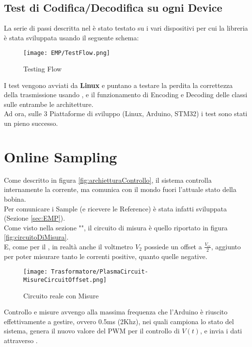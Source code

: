 \subsection{Test di Codifica/Decodifica su ogni Device}
La serie di passi descritta nel  è stato testato su i vari dispositivi per cui la libreria è stata sviluppata usando il seguente schema:
\begin{figure}[h]
	\centering
	\texttt{[image: EMP/TestFlow.png]}
	\caption[EMP Benchmark Testing Flow]{Testing Flow}
\end{figure}

\noindent
I test vengono avviati da \textbf{Linux} e puntano a testare la perdita la correttezza della trasmissione usando , e il funzionamento di Encoding e Decoding delle classi sulle entrambe le architetture.\\
Ad ora, sulle 3 Piattaforme di sviluppo (Linux, Arduino, STM32) i test sono stati un pieno successo.

\newpage
\section{Online Sampling}
Come descritto in figura \ref{fig:archietturaControllo}, il sistema controlla internamente la corrente, ma comunica con il mondo fuori l'attuale stato della bobina.\\
Per comunicare i Sample (e ricevere le Reference) è stata infatti sviluppata (Sezione \ref{sec:EMP}).\\
Come visto nella sezione "", il circuito di misura è quello riportato in figura \ref{fig:circuitoDiMisura}.\\
E, come per il , in realtà anche il voltmetro $V_2$ possiede un offset a $\frac{V_{cc}}{2}$, aggiunto per poter misurare tanto le correnti positive, quanto quelle negative.
\begin{figure}[h]
	\centering
	\texttt{[image: Trasformatore/PlasmaCircuit-MisureCircuitOffset.png]}
	\caption[Circuito equivalente del Plasma con l'offset delle Misure]{Circuito reale con Misure}
\end{figure}

\noindent
Controllo e misure avvengo alla massima frequenza che l'Arduino è riuscito effettivamente a gestire, ovvero 0.5ms (2Khz), nei quali campiona lo stato del sistema, genera il nuovo valore del PWM per il controllo di $V(t)$, e invia i dati attraverso .

